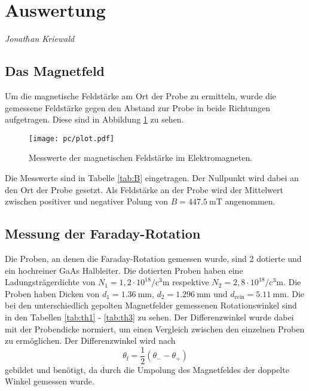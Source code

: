 \section{Auswertung}
\label{sec:Auswertung}
{\footnotesize \textit{Jonat$\hbar$an Kriewald}}

\subsection{Das Magnetfeld}
Um die magnetische Feldstärke am Ort der Probe zu ermitteln, wurde die gemessene Feldstärke gegen den Abstand zur Probe in beide Richtungen aufgetragen.
Diese sind in Abbildung \ref{fig:plot} zu sehen.
\begin{figure}
  \centering
  \texttt{[image: pc/plot.pdf]}
  \caption{Messwerte der magnetischen Feldstärke im Elektromagneten.}
  \label{fig:plot}
\end{figure}
Die Messwerte sind in Tabelle \ref{tab:B} eingetragen.
Der Nullpunkt wird dabei an den Ort der Probe gesetzt.
Als Feldstärke an der Probe wird der Mittelwert zwischen positiver und negativer Polung von $B = \SI{447.5}{\milli\tesla}$ angenommen.

\subsection{Messung der Faraday-Rotation}
Die Proben, an denen die Faraday-Rotation gemessen wurde, sind 2 dotierte und ein hochreiner GaAs Halbleiter.
Die dotierten Proben haben eine Ladungsträgerdichte von $N_1 =  1{,}2 \cdot 10^{18} \si{\per\cubic\centi\meter}$ respektive $N_2 = 2{,}8 \cdot 10^{18} \si{\per\cubic\centi\meter}$.
Die Proben haben Dicken von $d_1 = \SI{1.36}{\milli\meter}$, $d_2 = \SI{1.296}{\milli\meter}$ und $d_\text{rein} = \SI{5.11}{\milli\meter}$.
Die bei den unterschiedlich gepolten Magnetfelder gemessenen Rotationswinkel sind in den Tabellen \ref{tab:th1} - \ref{tab:th3} zu sehen.
Der Differenzwinkel wurde dabei mit der Probendicke normiert, um einen Vergleich zwischen den einzelnen Proben zu ermöglichen.
Der Differenzwinkel wird nach 
\begin{equation}
	\theta_\text{f} = \frac{1}{2}(\theta_- -\theta_+)
\end{equation}
gebildet und benötigt, da durch die Umpolung des Magnetfeldes der doppelte Winkel gemessen wurde.




